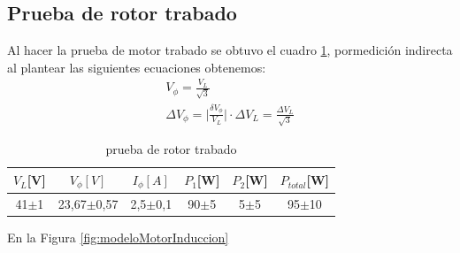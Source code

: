 \documentclass[11pt,letterpaper]{article}     %
\begin{document}
\subsection{Prueba de rotor trabado}
Al hacer la prueba de motor trabado se obtuvo el cuadro \ref{cuadro prueba de rotor trabado}, pormedición indirecta al plantear las siguientes ecuaciones obtenemos:
\begin{eqnarray}
V_{\phi}=\frac{V_L}{\sqrt{3}}\\
\Delta V_{\phi}= \bigg|\frac{\delta V_{\phi}}{V_L}\bigg| \cdot \Delta V_L = \frac{\Delta V_L}{\sqrt{3}}
\end{eqnarray}

\begin{table}[H]
	\centering
	\label{cuadro prueba de rotor trabado}
	\caption{prueba de rotor trabado}
	\begin{tabular}{|c|c|c|c|c|c|}
		\hline
		$V_L$[V]&$V_{\phi}[V]$& $I_{\phi}[A]$ & $P_1$[W]&$P_2$[W]&$P_{total}$[W]\\ \hline
		41$\pm$1& 23,67$\pm$0,57&2,5$\pm$0,1&90$\pm$5&5$\pm$5& 95$\pm$10\\ \hline
	\end{tabular}
\end{table}
En la Figura \ref{fig:modeloMotorInduccion}
\end{document}
